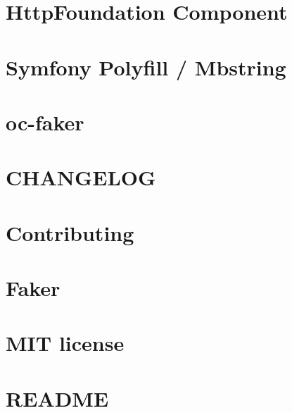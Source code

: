 \let\mypdfximage\pdfximage\def\pdfximage{\immediate\mypdfximage}\documentclass[twoside]{book}
\newcommand{\+}{\discretionary{\mbox{\scriptsize$\hookleftarrow$}}{}{}}
\begin{document}
\chapter{Http\+Foundation Component}
\label{md_pixel_shop_vendor_symfony_http_foundation__r_e_a_d_m_e}

\chapter{Symfony Polyfill / Mbstring}
\label{md_pixel_shop_vendor_symfony_polyfill_mbstring__r_e_a_d_m_e}

\chapter{oc-\/faker}
\label{md_rahman_faker__r_e_a_d_m_e}

\chapter{CHANGELOG}
\label{md_rahman_faker_vendor_fzaninotto_faker__c_h_a_n_g_e_l_o_g}

\chapter{Contributing}
\label{md_rahman_faker_vendor_fzaninotto_faker__c_o_n_t_r_i_b_u_t_i_n_g}

\chapter{Faker}
\label{md_rahman_faker_vendor_fzaninotto_faker_readme}

\chapter{MIT license}
\label{md_rainlab_builder__l_i_c_e_n_c_e}

\chapter{README}
\label{md_rainlab_builder__r_e_a_d_m_e}

\end{document}
